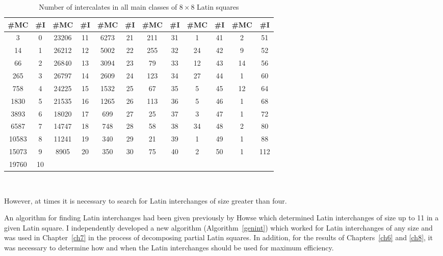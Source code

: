 \documentclass[12pt]{report}
\begin{document}
\begin{table}
\begin{center}
\caption{Number of intercalates in all main classes of $8 \times 8$ Latin squares}
\vspace{3mm}
\label{ebad}
\begin{tabular}{|c|c| |c|c| |c|c| |c|c| |c|c| |c|c|}
\hline
\#MC & \#I &  \#MC&\#I    & \#MC&\#I   &  \#MC&\#I  &   \#MC&\#I &   \#MC&\#I \\
\hline
3&0  &	    23206&11  &	6273&21	 &  211&31  &	1&41  &	    2&51   \\
14&1  &	    26212&12  &	5002&22	 &  255&32  &	24&42  &    9&52   \\
66&2  &	    26840&13  &	3094&23	 &  79&33  &	12&43  &    14&56   \\
265&3  &    26797&14  &	2609&24	 &  123&34  &	27&44  &    1&60   \\
758&4  &    24225&15  &	1532&25	 &  67&35  &	5&45  &	    12&64   \\
1830&5  &   21535&16  &	1265&26	 &  113&36  &	5&46  &	    1&68   \\
3893&6  &   18020&17  &	699&27  &   25&37  &	3&47  &	    1&72   \\
6587&7  &   14747&18  &	748&28  &   58&38  &	34&48  &    2&80   \\
10583&8	 &  11241&19  &	340&29  &   21&39  &	1&49  &	    1&88   \\
15073&9	 &  8905&20  &	350&30  &   75&40  &	2&50  &	    1&112  \\
19760&10  &     &     &    &    &     &    &     &    &      &      \\
\hline
\end{tabular} \vspace{3mm} \\
\end{center}
\end{table}


However, at times it is necessary to search for Latin interchanges
of size greater than four.  

An algorithm for finding Latin interchanges had been given previously by
Howse \cite{howse:thesis} which determined Latin interchanges of size up
to 11 in a given Latin square.  I independently developed a new algorithm
(Algorithm~\ref{genint})
which worked for Latin interchanges of any size and was used in Chapter~\ref{ch7} 
in the process of decomposing partial Latin squares.  In addition,
for the results of Chapters~\ref{ch6} and \ref{ch8}, it was necessary to determine how
and when the Latin interchanges should be used for maximum efficiency.
\newpage
\end{document}
